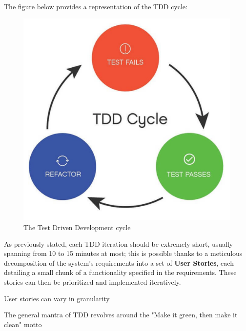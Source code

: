 The figure below provides a representation of the TDD cycle:
\begin{figure}[h]
    \centering
    \includegraphics[width=\linewidth]{figures/tdd_cycle.jpg}
    \caption{The Test Driven Development cycle}
    \label{fig}
\end{figure}

As previously stated, each TDD iteration should be extremely short, usually spanning from 10 to 15 minutes at most; this is possible thanks to a meticulous decomposition of the system's requirements into a set of \textbf{User Stories}, each detailing a small chunk of a functionality specified in the requirements. These stories can then be prioritized and implemented iteratively.

User stories can vary in granularity

The general mantra of TDD revolves around the "Make it green, then make it clean" motto


